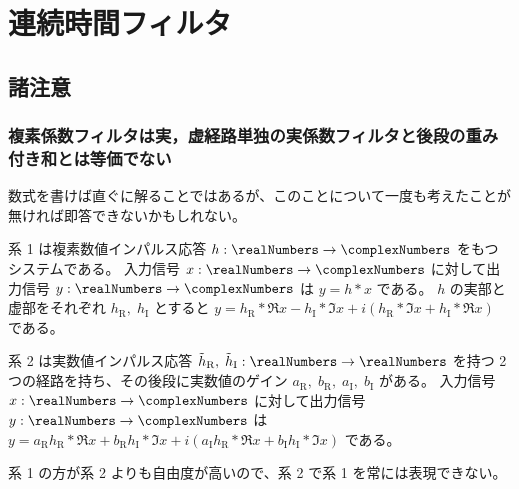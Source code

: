 \chapter{連続時間フィルタ}
    \section{諸注意}
        \subsection{複素係数フィルタは実，虚経路単独の実係数フィルタと後段の重み付き和とは等価でない}
            数式を書けば直ぐに解ることではあるが、このことについて一度も考えたことが無ければ即答できないかもしれない。
            \par
            系 1 は複素数値インパルス応答 $h:\realNumbers\to\complexNumbers$ をもつシステムである。
            入力信号 $x:\realNumbers\to\complexNumbers$ に対して出力信号 $y:\realNumbers\to\complexNumbers$ は $y = h*x$ である。
            $h$ の実部と虚部をそれぞれ $h_\text{R},\;h_\text{I}$ とすると $y = h_\text{R}*\Re{x} - h_\text{I}*\Im{x} + i(h_\text{R}*\Im{x} + h_\text{I}*\Re{x})$ である。
            \par
            系 2 は実数値インパルス応答 $\tilde{h}_\text{R},\;\tilde{h}_\text{I}:\realNumbers\to\realNumbers$ を持つ 2 つの経路を持ち、その後段に実数値のゲイン $a_\text{R},\;b_\text{R},\;a_\text{I},\;b_\text{I}$ がある。
            入力信号 $x:\realNumbers\to\complexNumbers$ に対して出力信号 $y:\realNumbers\to\complexNumbers$ は $y = a_\text{R}h_\text{R}*\Re{x} + b_\text{R}h_\text{I}*\Im{x} + i(a_\text{I}h_\text{R}*\Re{x} + b_\text{I}h_\text{I}*\Im{x})$ である。
            \par
            系 1 の方が系 2 よりも自由度が高いので、系 2 で系 1 を常には表現できない。